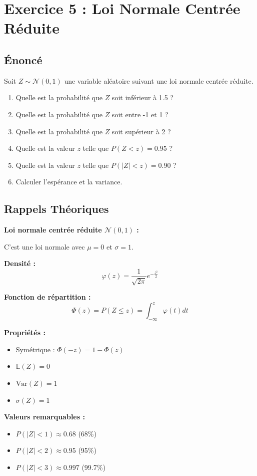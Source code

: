 \documentclass[11pt,a4paper]{article}
\newcommand{\Var}{\text{Var}}
\newcommand{\E}{\mathbb{E}}
\begin{document}
\newpage

\section{Exercice 5 : Loi Normale Centrée Réduite}

\subsection{Énoncé}

Soit $Z \sim \mathcal{N}(0, 1)$ une variable aléatoire suivant une loi normale centrée réduite.

\begin{enumerate}
    \item Quelle est la probabilité que $Z$ soit inférieur à 1.5 ?
    \item Quelle est la probabilité que $Z$ soit entre -1 et 1 ?
    \item Quelle est la probabilité que $Z$ soit supérieur à 2 ?
    \item Quelle est la valeur $z$ telle que $P(Z < z) = 0.95$ ?
    \item Quelle est la valeur $z$ telle que $P(|Z| < z) = 0.90$ ?
    \item Calculer l'espérance et la variance.
\end{enumerate}

\subsection{Rappels Théoriques}

\begin{rappelbox}
\textbf{Loi normale centrée réduite $\mathcal{N}(0, 1)$ :}

C'est une loi normale avec $\mu = 0$ et $\sigma = 1$.

\textbf{Densité :}
$$\varphi(z) = \frac{1}{\sqrt{2\pi}} e^{-\frac{z^2}{2}}$$

\textbf{Fonction de répartition :}
$$\Phi(z) = P(Z \leq z) = \int_{-\infty}^{z} \varphi(t) dt$$

\textbf{Propriétés :}
\begin{itemize}
    \item Symétrique : $\Phi(-z) = 1 - \Phi(z)$
    \item $\E(Z) = 0$
    \item $\Var(Z) = 1$
    \item $\sigma(Z) = 1$
\end{itemize}

\textbf{Valeurs remarquables :}
\begin{itemize}
    \item $P(|Z| < 1) \approx 0.68$ (68\%)
    \item $P(|Z| < 2) \approx 0.95$ (95\%)
    \item $P(|Z| < 3) \approx 0.997$ (99.7\%)
\end{itemize}
\end{rappelbox}
\end{document}
